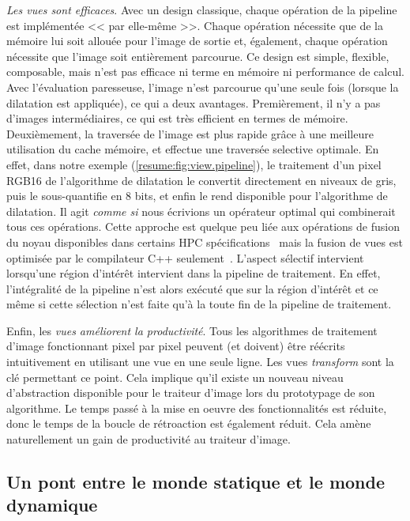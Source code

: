 \emph{Les vues sont efficaces}. Avec un design classique, chaque opération de la pipeline est implémentée << par
elle-même >>. Chaque opération nécessite que de la mémoire lui soit allouée pour l'image de sortie et, également, chaque
opération nécessite que l'image soit entièrement parcourue. Ce design est simple, flexible, composable, mais n'est pas
efficace ni terme en mémoire ni performance de calcul. Avec l'évaluation paresseuse, l'image n'est parcourue qu'une
seule fois (lorsque la dilatation est appliquée), ce qui a deux avantages. Premièrement, il n'y a pas d'images
intermédiaires, ce qui est très efficient en termes de mémoire. Deuxièmement, la traversée de l'image est plus rapide
grâce à une meilleure utilisation du cache mémoire, et effectue une traversée selective optimale. En effet, dans notre
exemple (\cref{resume:fig:view.pipeline}), le traitement d'un pixel RGB16 de l'algorithme de dilatation le convertit
directement en niveaux de gris, puis le sous-quantifie en 8 bits, et enfin le rend disponible pour l'algorithme de
dilatation. Il agit \emph{comme si} nous écrivions un opérateur optimal qui combinerait tous ces opérations. Cette
approche est quelque peu liée aux opérations de fusion du noyau disponibles dans certains HPC
spécifications~\parencite{openvx.2019} mais la fusion de vues est optimisée par le compilateur C++
seulement~\parencite{brown.2018.ranges}. L'aspect sélectif intervient lorsqu'une région d'intérêt intervient dans la
pipeline de traitement. En effet, l'intégralité de la pipeline n'est alors exécuté que sur la région d'intérêt et ce
même si cette sélection n'est faite qu'à la toute fin de la pipeline de traitement.

Enfin, les \emph{vues améliorent la productivité}. Tous les algorithmes de traitement d'image fonctionnant pixel par
pixel peuvent (et doivent) être réécrits intuitivement en utilisant une vue en une seule ligne. Les vues
\emph{transform} sont la clé permettant ce point. Cela implique qu'il existe un nouveau niveau d'abstraction disponible
pour le traiteur d'image lors du prototypage de son algorithme. Le temps passé à la mise en oeuvre des fonctionnalités
est réduite, donc le temps de la boucle de rétroaction est également réduit. Cela amène naturellement un gain de
productivité au traiteur d'image.


\subsection*{Un pont entre le monde statique et le monde dynamique}


